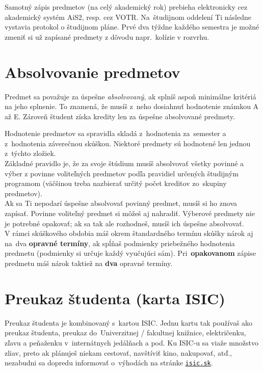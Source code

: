Samotný zápis predmetov (na celý akademický rok) prebieha elektronicky
cez akademický systém AiS2, resp. cez VOTR. Na~študijnom oddelení Ti následne vystavia protokol o študijnom pláne. Prvé dva týždne každého semestra je možné zmeniť si už zapísané predmety z dôvodu napr.\ kolízie v rozvrhu.

\section{Absolvovanie predmetov}

Predmet sa považuje za úspešne \emph{absolvovaný}, ak splníš aspoň minimálne kritériá
na jeho splnenie. To znamená, že musíš z~neho dosiahnuť hodnotenie známkou A až E. Zároveň študent získa kredity len za úspešne absolvované predmety.

Hodnotenie predmetov sa spravidla skladá z~hodnotenia za~semester
a z~hodnotenia záverečnou skúškou. Niektoré predmety sú hodnotené
len jednou z~týchto zložiek. \\

Základné pravidlo je, že za svoje štúdium musíš absolvovať všetky
povinné a výber z povinne voliteľných predmetov podľa pravidiel určených
študijným programom (väčšinou treba nazbierať určitý počet kreditov
zo~skupiny predmetov). \\

Ak sa Ti nepodarí úspešne absolvovať povinný predmet, musíš si ho znova zapísať.
Povinne voliteľný predmet si môžeš aj nahradiť. Výberové predmety
nie je potrebné opakovať; ak sa tak ale rozhodneš, musíš ich úspešne
absolvovať. \\

V rámci skúškového obdobia máš okrem štandardného termínu skúšky nárok
aj na~dva \textbf{opravné termíny}, ak spĺňaš podmienky priebežného hodnotenia predmetu (podmienky si určuje každý vyučujúci sám). Pri~\textbf{opakovanom} zápise predmetu máš nárok taktiež na \textbf{dva} opravné termíny.

\section{Preukaz študenta (karta ISIC)}

Preukaz študenta je kombinovaný s~kartou ISIC. Jednu kartu tak používaš
ako preukaz študenta, preukaz do~Univerzitnej / fakultnej knižnice, električenku, zľavu a peňaženku v~internátnych jedálňach a pod. Ku ISIC-u sa viaže množstvo zliav, preto ak plánuješ niekam cestovať, navštíviť kino, nakupovať, atď., nezabudni sa dopredu informovať
o~výhodách na stránke \href{http://www.isic.sk}{\texttt{isic.sk}}.


